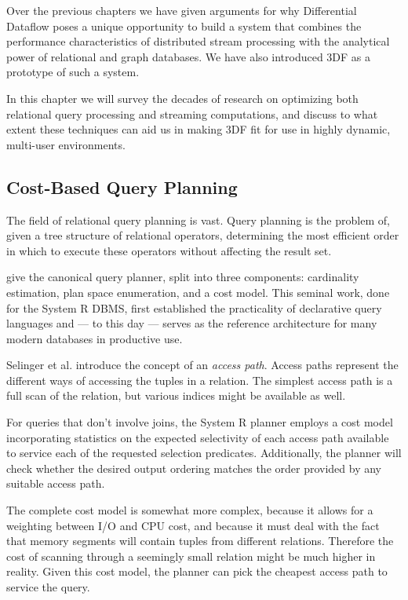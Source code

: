 \documentclass[../index.tex]{subfiles}
\begin{document}
Over the previous chapters we have given arguments for why
Differential Dataflow poses a unique opportunity to build a system
that combines the performance characteristics of distributed stream
processing with the analytical power of relational and graph
databases. We have also introduced 3DF as a prototype of such a
system.

In this chapter we will survey the decades of research on optimizing
both relational query processing and streaming computations, and
discuss to what extent these techniques can aid us in making 3DF fit
for use in highly dynamic, multi-user environments.

\subsection{Cost-Based Query Planning}

The field of relational query planning is vast. Query planning is the
problem of, given a tree structure of relational operators,
determining the most efficient order in which to execute these
operators without affecting the result set.

\cite{selinger1979access} give the canonical query planner, split into
three components: cardinality estimation, plan space enumeration, and
a cost model. This seminal work, done for the System R DBMS, first
established the practicality of declarative query languages and — to
this day — serves as the reference architecture for many modern
databases in productive use.

Selinger et al. introduce the concept of an \emph{access path}. Access
paths represent the different ways of accessing the tuples in a
relation. The simplest access path is a full scan of the relation, but
various indices might be available as well.

For queries that don't involve joins, the System R planner employs a
cost model incorporating statistics on the expected selectivity of
each access path available to service each of the requested selection
predicates. Additionally, the planner will check whether the desired
output ordering matches the order provided by any suitable access
path.

The complete cost model is somewhat more complex, because it allows
for a weighting between I/O and CPU cost, and because it must deal
with the fact that memory segments will contain tuples from different
relations. Therefore the cost of scanning through a seemingly small
relation might be much higher in reality. Given this cost model, the
planner can pick the cheapest access path to service the query.
\end{document}
